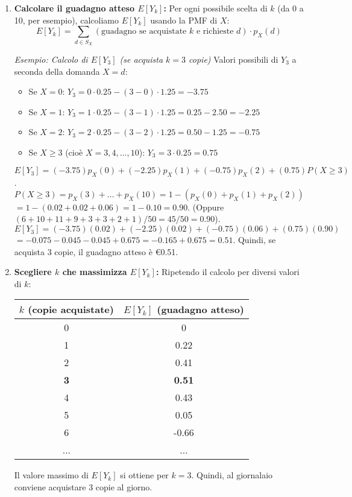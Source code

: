 \begin{enumerate}
    \item \textbf{Calcolare il guadagno atteso $E[Y_k]$:} Per ogni possibile scelta di $k$ (da 0 a 10, per esempio), calcoliamo $E[Y_k]$ usando la PMF di $X$:
    \[ E[Y_k] = \sum_{d \in S_X} (\text{guadagno se acquistate } k \text{ e richieste } d) \cdot p_X(d) \]
    
    \textit{Esempio: Calcolo di $E[Y_3]$ (se acquista $k=3$ copie)}
    Valori possibili di $Y_3$ a seconda della domanda $X=d$:
    \begin{itemize}
        \item Se $X=0$: $Y_3 = 0 \cdot 0.25 - (3-0) \cdot 1.25 = -3.75$
        \item Se $X=1$: $Y_3 = 1 \cdot 0.25 - (3-1) \cdot 1.25 = 0.25 - 2.50 = -2.25$
        \item Se $X=2$: $Y_3 = 2 \cdot 0.25 - (3-2) \cdot 1.25 = 0.50 - 1.25 = -0.75$
        \item Se $X \ge 3$ (cioè $X=3, 4, \dots, 10$): $Y_3 = 3 \cdot 0.25 = 0.75$
    \end{itemize}
    $E[Y_3] = (-3.75)p_X(0) + (-2.25)p_X(1) + (-0.75)p_X(2) + (0.75)P(X \ge 3)$.
    $P(X \ge 3) = p_X(3)+\dots+p_X(10) = 1 - (p_X(0)+p_X(1)+p_X(2))$
    $= 1 - (0.02+0.02+0.06) = 1 - 0.10 = 0.90$.
    (Oppure $(6+10+11+9+3+3+2+1)/50 = 45/50 = 0.90$).
    $E[Y_3] = (-3.75)(0.02) + (-2.25)(0.02) + (-0.75)(0.06) + (0.75)(0.90)$
    $= -0.075 - 0.045 - 0.045 + 0.675 = -0.165 + 0.675 = 0.51$.
    Quindi, se acquista 3 copie, il guadagno atteso è €0.51.

    \item \textbf{Scegliere $k$ che massimizza $E[Y_k]$:}
    Ripetendo il calcolo per diversi valori di $k$:
    \begin{center}
    \begin{tabular}{cc}
    \toprule
    $k$ (copie acquistate) & $E[Y_k]$ (guadagno atteso) \\
    \midrule
    0 & 0 \\ %
    1 & 0.22 \\
    2 & 0.41 \\
    \textbf{3} & \textbf{0.51} \\ %
    4 & 0.43 \\
    5 & 0.05 \\
    6 & -0.66 \\
    ... & ... \\ %
    \bottomrule
    \end{tabular}
    \end{center}
    Il valore massimo di $E[Y_k]$ si ottiene per $k=3$. Quindi, al giornalaio conviene acquistare 3 copie al giorno.
\end{enumerate}

